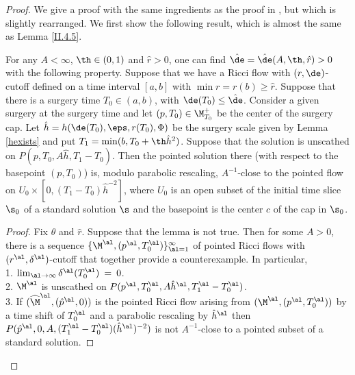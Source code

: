 \begin{proof}
We give a proof with the same ingredients as the proof in
\cite{Perelman2}, but which
is slightly rearranged.
We first show the following result, which is almost the same as
Lemma \ref{II.4.5}.
\begin{lemma}
  \label{lem:kl-evolution-surgery-cap-existence-standard-solutions-2}
 \label{intermediate}
For any $A<\infty$, $\th\in (0,1)$ and $\hat r>0$,
one can find $\hat\de=\hat\de(A,\th,\hat r)>0$
with the following property.  Suppose that we
have a Ricci flow with $(r, \de)$-cutoff
defined on a time interval $[a,b]$ with  $\min r=r(b)\geq \hat r$.
Suppose that there is a surgery time
$T_0\in (a,b)$, with $\de(T_0)\leq \hat\de$.  Consider a given
surgery at the surgery time and let
$(p,T_0)\in\M_{T_0}^+$
be the center of the surgery cap.
Let $\hat h= h(\de(T_0),\eps,r(T_0),\Phi)$ be the surgery
scale given by Lemma \ref{hexists} and put
$T_1=\min(b,T_0+\th \hat h^2)$.
Suppose that the solution is unscathed on $P(p,T_0,A\hat h,T_1-T_0)$.
Then the pointed solution there (with respect to the basepoint
$(p, T_0)$) is, modulo parabolic
rescaling, $A^{-1}$-close to the pointed flow on
$U_0\times [0,(T_1-T_0)\hat h^{-2}]$, where
$U_0$ is an open subset of the initial time slice $\s_0$
of a standard solution
$\s$ and the basepoint is
the center $c$ of the cap in $\s_0$.
\end{lemma}
\begin{proof}
Fix $\theta$ and $\hat{r}$.
Suppose that the lemma is not true. Then for some $A > 0$,
there is a sequence $\{\M^\al, (p^\al,T_0^\al) \}_{\al = 1}^\infty$ of
pointed Ricci flows with $(r^\al, \delta^\al)$-cutoff
that together provide a
counterexample. In particular,\\
1. $\lim_{\al \rightarrow \infty}
\delta^\al (T_0^\al) \: = \: 0$. \\
2. $\M^\al$ is unscathed on
$P(p^\al, T_0^\al, A {\hat h}^\al, T_1^\al - T_0^\al)$.\\
3. If
$(\widehat{\M}^\al, (\hat{p}^\al,0))$ is the pointed Ricci
flow arising from $(\M^\al, (p^\al,T_0^\al))$ by
a time shift of $T_0^\al$ and a
parabolic rescaling by ${\hat h}^\al$ then
$P(\hat{p}^\al, 0, A, (T_1^\al - T_0^\al)(\hat{h}^\al)^{-2})$
is not $A^{-1}$-close to a pointed
subset of a standard solution.


\end{proof}
\end{proof}
